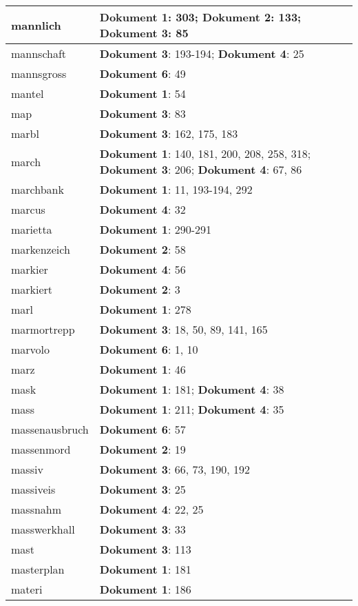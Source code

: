 \documentclass[a5paper]{article}
\begin{document}
\begin{longtable}[l]{|l|p{3in}|}
\hline
mannlich & \textbf{Dokument 1}: 303; \textbf{Dokument 2}: 133; \textbf{Dokument 3}: 85 \\
\hline
mannschaft & \textbf{Dokument 3}: 193-194; \textbf{Dokument 4}: 25 \\
\hline
mannsgross & \textbf{Dokument 6}: 49 \\
\hline
mantel & \textbf{Dokument 1}: 54 \\
\hline
map & \textbf{Dokument 3}: 83 \\
\hline
marbl & \textbf{Dokument 3}: 162, 175, 183 \\
\hline
march & \textbf{Dokument 1}: 140, 181, 200, 208, 258, 318; \textbf{Dokument 3}: 206; \textbf{Dokument 4}: 67, 86 \\
\hline
marchbank & \textbf{Dokument 1}: 11, 193-194, 292 \\
\hline
marcus & \textbf{Dokument 4}: 32 \\
\hline
marietta & \textbf{Dokument 1}: 290-291 \\
\hline
markenzeich & \textbf{Dokument 2}: 58 \\
\hline
markier & \textbf{Dokument 4}: 56 \\
\hline
markiert & \textbf{Dokument 2}: 3 \\
\hline
marl & \textbf{Dokument 1}: 278 \\
\hline
marmortrepp & \textbf{Dokument 3}: 18, 50, 89, 141, 165 \\
\hline
marvolo & \textbf{Dokument 6}: 1, 10 \\
\hline
marz & \textbf{Dokument 1}: 46 \\
\hline
mask & \textbf{Dokument 1}: 181; \textbf{Dokument 4}: 38 \\
\hline
mass & \textbf{Dokument 1}: 211; \textbf{Dokument 4}: 35 \\
\hline
massenausbruch & \textbf{Dokument 6}: 57 \\
\hline
massenmord & \textbf{Dokument 2}: 19 \\
\hline
massiv & \textbf{Dokument 3}: 66, 73, 190, 192 \\
\hline
massiveis & \textbf{Dokument 3}: 25 \\
\hline
massnahm & \textbf{Dokument 4}: 22, 25 \\
\hline
masswerkhall & \textbf{Dokument 3}: 33 \\
\hline
mast & \textbf{Dokument 3}: 113 \\
\hline
masterplan & \textbf{Dokument 1}: 181 \\
\hline
materi & \textbf{Dokument 1}: 186 \\

\end{longtable}
\end{document}
